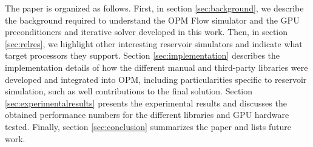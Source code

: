 The paper is organized as follows. First, in section \ref{sec:background}, we describe the background required to understand the OPM Flow simulator and the GPU preconditioners and iterative solver developed in this work. Then, in section \ref{sec:relres}, we highlight other interesting reservoir simulators and indicate what target processors they support. Section \ref{sec:implementation} describes the implementation details of how the different manual and third-party libraries were developed and integrated into OPM, including particularities specific to reservoir simulation, such as well contributions to the final solution. Section \ref{sec:experimentalresults} presents the experimental results and discusses the obtained performance numbers for the different libraries and GPU hardware tested. Finally, section \ref{sec:conclusion} summarizes the paper and lists future work. 
